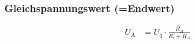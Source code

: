 



\subsubsection{Gleichspannungswert (=Endwert)}
\begin{align*}
    U_A & = U_q\cdot\frac{R_A}{R_i+R_A}
\end{align*}







